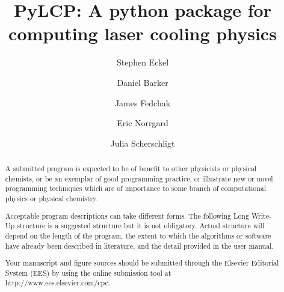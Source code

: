 \documentclass[final,5p,times,twocolumn]{elsarticle}
\begin{document}
\begin{frontmatter}



\title{PyLCP: A python package for computing laser cooling physics}


\author[a]{Stephen Eckel}
\author[a]{Daniel Barker}
\author[a]{James Fedchak}
\author[a]{Eric Norrgard}
\author[a]{Julia Scherschligt}

\address[a]{National Institute of Standards and Technology, Sensor Sciences Division, 100 Bureau Dr., Gaithersburg, MD 20899}

\begin{abstract}
A submitted program is expected to be of benefit to other physicists or physical chemists, or be an exemplar of good programming practice, or illustrate new or novel programming techniques which are of importance to some branch of computational physics or physical chemistry.

Acceptable program descriptions can take different forms. The following Long Write-Up structure is a suggested structure but it is not obligatory. Actual structure will depend on the length of the program, the extent to which the algorithms or software have already been described in literature, and the detail provided in the user manual.

Your manuscript and figure sources should be submitted through the Elsevier Editorial System (EES) by using the online submission tool at \\
http://www.ees.elsevier.com/cpc.


\end{abstract}
\end{frontmatter}
\end{document}
